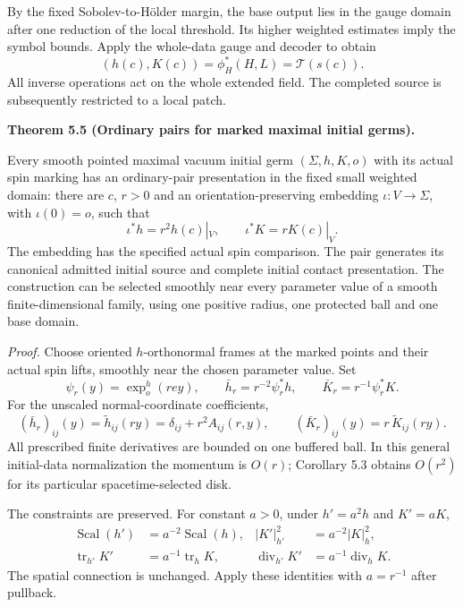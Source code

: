 \documentclass[
  english,
  11pt,
  reqno]{amsart}
\makeatletter
\newcommand{\pandocstatementheading}[1]{%
  \par\if@nobreak\else
    \addpenalty{\@beginparpenalty}%
    \addvspace{.5\baselineskip plus .2\baselineskip minus .2\baselineskip}%
  \fi
  {\normalfont\bfseries #1\par}%
  \nobreak\@afterindenttrue\@afterheading
}
\makeatother
\begin{document}
By the fixed Sobolev-to-Hölder margin, the base output lies in the gauge
domain after one reduction of the local threshold. Its higher weighted
estimates imply the symbol bounds. Apply the whole-data gauge and
decoder to obtain%
 \[
(h(c),K(c))
=
\phi_H^*(H,L)
=
\mathcal T(s(c)).
\] All inverse operations act on the whole extended field. The completed
source is subsequently restricted to a local patch.

\pandocstatementheading{\leavevmode{}\label{thm:submission-marked-initial-coverage}Theorem 5.5 (Ordinary pairs for marked maximal initial germs).}

Every smooth pointed maximal vacuum initial germ \((\Sigma,h,K,o)\) with
its actual spin marking has an ordinary-pair presentation in the fixed
small weighted domain: there are \(c\), \(r>0\) and an
orientation-preserving embedding \(\iota:V\to\Sigma\), with
\(\iota(0)=o\), such that%
 \[
\iota^*h=r^2h(c)|_V,
\qquad
\iota^*K=rK(c)|_V.
\] The embedding has the specified actual spin comparison. The pair
generates its canonical admitted initial source and complete initial
contact presentation. The construction can be selected smoothly near
every parameter value of a smooth finite-dimensional family, using one
positive radius, one protected ball and one base domain.

\emph{Proof.} Choose oriented \(h\)-orthonormal frames at the marked
points and their actual spin lifts, smoothly near the chosen parameter
value. Set%
 \[
\psi_r(y)=\exp^h_o(r e y),
\qquad
\bar h_r=r^{-2}\psi_r^*h,
\qquad
\bar K_r=r^{-1}\psi_r^*K.
\] For the unscaled normal-coordinate coefficients,%
 \[
(\bar h_r)_{ij}(y)=\widetilde h_{ij}(ry)
=\delta_{ij}+r^2A_{ij}(r,y),
\qquad
(\bar K_r)_{ij}(y)=r\,\widetilde K_{ij}(ry).
\] All prescribed finite derivatives are bounded on one buffered ball.
In this general initial-data normalization the momentum is \(O(r)\);
Corollary 5.3 obtains \(O(r^2)\) for its particular spacetime-selected
disk.

The constraints are preserved. For constant \(a>0\), under \(h'=a^2h\)
and \(K'=aK\),%
 \[
\begin{aligned}
\operatorname{Scal}(h')&=a^{-2}\operatorname{Scal}(h),
&
|K'|_{h'}^2&=a^{-2}|K|_h^2,\\
\operatorname{tr}_{h'}K'&=a^{-1}\operatorname{tr}_hK,
&
\operatorname{div}_{h'}K'&=a^{-1}\operatorname{div}_hK.
\end{aligned}
\] The spatial connection is unchanged. Apply these identities with
\(a=r^{-1}\) after pullback.
\end{document}
